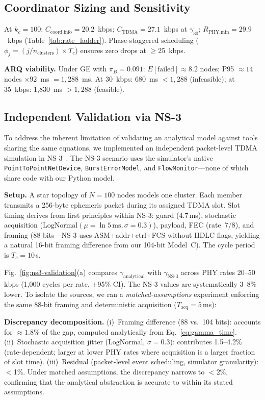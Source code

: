 \documentclass[journal]{IEEEtran}
\begin{document}
\subsection{Coordinator Sizing and Sensitivity}

At $k_c = 100$: $C_{\text{coord,info}} = 20.2$~kbps; $C_{\text{TDMA}} = 27.1$~kbps at $\gamma_{30}$; $R_{\text{PHY,min}} = 29.9$~kbps (Table~\ref{tab:rate_ladder}). Phase-staggered scheduling ($\phi_j = (j / n_{\text{clusters}}) \times T_c$) ensures zero drops at $\geq$25~kbps.

\textbf{ARQ viability.} Under GE with $\pi_B = 0.091$: $E[\text{failed}] \approx 8.2$ nodes; P95 $\approx 14$ nodes $\times 92$~ms $= 1{,}288$~ms. At 30~kbps: 680~ms $< 1{,}288$ (infeasible); at 35~kbps: 1,830~ms $> 1{,}288$ (feasible).

\subsection{Independent Validation via NS-3}
\label{sec:ns3-validation}

To address the inherent limitation of validating an analytical model against tools sharing the same equations, we implemented an independent packet-level TDMA simulation in NS-3~\cite{ns3}. The NS-3 scenario uses the simulator's native \texttt{PointToPointNetDevice}, \texttt{BurstErrorModel}, and \texttt{FlowMonitor}---none of which share code with our Python model.

\textbf{Setup.} A star topology of $N{=}100$ nodes models one cluster. Each member transmits a 256-byte ephemeris packet during its assigned TDMA slot. Slot timing derives from first principles within NS-3: guard (4.7\,ms), stochastic acquisition ($\mathrm{LogNormal}(\mu{=}\ln 5\,\mathrm{ms},\sigma{=}0.3)$), payload, FEC (rate~7/8), and framing (88 bits---NS-3 uses ASM+addr+ctrl+FCS without HDLC flags, yielding a natural 16-bit framing difference from our 104-bit Model~C). The cycle period is $T_c{=}10$\,s.

Fig.~\ref{fig:ns3-validation}(a) compares $\gamma_{\mathrm{analytical}}$ with $\gamma_{\mathrm{NS\text{-}3}}$ across PHY rates 20--50\,kbps (1{,}000 cycles per rate, $\pm$95\% CI). The NS-3 values are systematically 3--8\% lower. To isolate the sources, we ran a \emph{matched-assumptions} experiment enforcing the same 88-bit framing and deterministic acquisition ($T_{\mathrm{acq}}{=}5$\,ms):

\textbf{Discrepancy decomposition.} (i)~Framing difference (88 vs.\ 104 bits): accounts for ${\approx}1.8\%$ of the gap, computed analytically from Eq.~\ref{eq:gamma_time}. (ii)~Stochastic acquisition jitter ($\mathrm{LogNormal}$, $\sigma{=}0.3$): contributes 1.5--4.2\% (rate-dependent; larger at lower PHY rates where acquisition is a larger fraction of slot time). (iii)~Residual (packet-level event scheduling, simulator granularity): $<$1\%. Under matched assumptions, the discrepancy narrows to $<$2\%, confirming that the analytical abstraction is accurate to within its stated assumptions.
\end{document}
